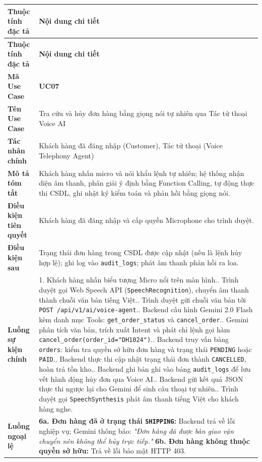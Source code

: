 \documentclass[11pt, a4paper]{report}
\begin{document}
\begin{longtable}{p{3.8cm} p{10.5cm}}
\toprule
\textbf{Thuộc tính đặc tả} & \textbf{Nội dung chi tiết} \\
\midrule
\endfirsthead
\toprule
\textbf{Thuộc tính đặc tả} & \textbf{Nội dung chi tiết} \\
\midrule
\endhead
\bottomrule
\endfoot
\textbf{Mã Use Case} & \textbf{UC07} \\
\midrule
\textbf{Tên Use Case} & Tra cứu và hủy đơn hàng bằng giọng nói tự nhiên qua Tác tử thoại Voice AI \\
\midrule
\textbf{Tác nhân chính} & Khách hàng đã đăng nhập (Customer), Tác tử thoại (Voice Telephony Agent) \\
\midrule
\textbf{Mô tả tóm tắt} & Khách hàng nhấn micro và nói khẩu lệnh tự nhiên; hệ thống nhận diện âm thanh, phân giải ý định bằng Function Calling, tự động thực thi CSDL, ghi nhật ký kiểm toán và phản hồi bằng giọng nói. \\
\midrule
\textbf{Điều kiện tiên quyết} & Khách hàng đã đăng nhập và cấp quyền Microphone cho trình duyệt. \\
\midrule
\textbf{Điều kiện sau} & Trạng thái đơn hàng trong CSDL được cập nhật (nếu là lệnh hủy hợp lệ); ghi log vào \texttt{audit\_logs}; phát âm thanh phản hồi ra loa. \\
\midrule
\textbf{Luồng sự kiện chính} & 
1. Khách hàng nhấn biểu tượng Micro nổi trên màn hình.\newline
2. Trình duyệt gọi Web Speech API (\texttt{SpeechRecognition}), chuyển âm thanh thành chuỗi văn bản tiếng Việt.\newline
3. Trình duyệt gửi chuỗi văn bản tới \texttt{POST /api/v1/ai/voice-agent}.\newline
4. Backend cấu hình Gemini 2.0 Flash kèm danh mục Tools: \texttt{get\_order\_status} và \texttt{cancel\_order}.\newline
5. Gemini phân tích văn bản, trích xuất Intent và phát chỉ lệnh gọi hàm \texttt{cancel\_order(order\_id="DH1024")}.\newline
6. Backend truy vấn bảng \texttt{orders}: kiểm tra quyền sở hữu đơn hàng và trạng thái \texttt{PENDING} hoặc \texttt{PAID}.\newline
7. Backend thực thi cập nhật trạng thái đơn thành \texttt{CANCELLED}, hoàn trả tồn kho.\newline
8. Backend ghi bản ghi vào bảng \texttt{audit\_logs} để lưu vết hành động hủy đơn qua Voice AI.\newline
9. Backend gửi kết quả JSON thực thi ngược lại cho Gemini để sinh câu thoại tự nhiên.\newline
10. Trình duyệt gọi \texttt{SpeechSynthesis} phát âm thanh tiếng Việt cho khách hàng nghe. \\
\midrule
\textbf{Luồng ngoại lệ} & 
\textbf{6a. Đơn hàng đã ở trạng thái \texttt{SHIPPING}:} Backend trả về lỗi nghiệp vụ; Gemini thông báo: \textit{"Đơn hàng đã được bàn giao vận chuyển nên không thể hủy trực tiếp."}\newline
\textbf{6b. Đơn hàng không thuộc quyền sở hữu:} Trả về lỗi bảo mật HTTP 403. \\
\bottomrule
\end{longtable}
\end{document}
